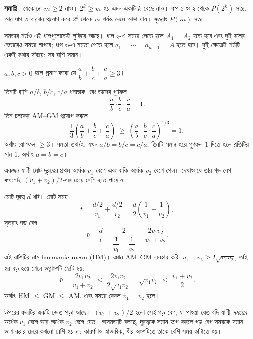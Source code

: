 \documentclass[11pt]{article}
\begin{document}
\textbf{সমাপ্তি।} যেকোনো $m \geq 2$ নাও। $2^k \geq m$ হয় এমন একটি $k$ বেছে নাও।
ধাপ ১ ও ২ থেকে $P(2^k)$ সত্য, আর ধাপ ৩ বারবার প্রয়োগ করে $2^k$ থেকে $m$ পর্যন্ত
নেমে আসা যায়। সুতরাং $P(m)$ সত্য।

সমতার শর্তও এই ধাপগুলোতেই লুকিয়ে আছে। ধাপ ২-এ সমতা পেতে হলে $A_1 = A_2$ হতে হবে
এবং দুই দলের ভেতরেও সমতা লাগবে; ধাপ ৩-এ সমতা পেতে হলে $a_1 = \cdots = a_{n-1}
= A$ হতে হবে। দুই ক্ষেত্রেই শর্তটি একই কথায় দাঁড়ায়: সব রাশি সমান।

\begin{example}
$a, b, c > 0$ হলে প্রমাণ করো যে
$\dfrac{a}{b} + \dfrac{b}{c} + \dfrac{c}{a} \geq 3$।
\end{example}

\begin{solbox}
তিনটি রাশি $a/b$, $b/c$, $c/a$ ধনাত্মক এবং তাদের গুণফল
\[
  \frac{a}{b} \cdot \frac{b}{c} \cdot \frac{c}{a} = 1 .
\]
তিন চলকের AM--GM প্রয়োগ করলে
\[
  \frac{1}{3}\left( \frac{a}{b} + \frac{b}{c} + \frac{c}{a} \right)
  \;\geq\; \left( \frac{a}{b} \cdot \frac{b}{c} \cdot \frac{c}{a} \right)^{1/3} = 1 ,
\]
অর্থাৎ যোগফল $\geq 3$। সমতা তখনই, যখন $a/b = b/c = c/a$; তিনটি সমান হয়ে গুণফল
$1$ দিতে হলে প্রতিটির মান $1$, অর্থাৎ $a = b = c$।
\end{solbox}

\begin{example}
একজন যাত্রী মোট দূরত্বের প্রথম অর্ধেক $v_1$ বেগে এবং বাকি অর্ধেক $v_2$ বেগে গেল।
দেখাও যে তার গড় বেগ কখনোই $(v_1+v_2)/2$-এর চেয়ে বেশি হতে পারে না।
\end{example}

\begin{solbox}
মোট দূরত্ব $d$ ধরি। মোট সময়
\[
  t = \frac{d/2}{v_1} + \frac{d/2}{v_2} = \frac{d}{2}\left( \frac{1}{v_1} + \frac{1}{v_2} \right),
\]
সুতরাং গড় বেগ
\[
  \bar{v} = \frac{d}{t} = \frac{2}{\dfrac{1}{v_1} + \dfrac{1}{v_2}}
          = \frac{2 v_1 v_2}{v_1 + v_2} .
\]
এই রাশিটির নাম harmonic mean (HM)। এখন AM--GM ব্যবহার করি: $v_1 + v_2 \geq
2\sqrt{v_1 v_2}$, তাই হর বড় হয়ে গেলে ভগ্নাংশটি ছোট হয়:
\[
  \bar{v} = \frac{2 v_1 v_2}{v_1+v_2}
  \;\leq\; \frac{2 v_1 v_2}{2\sqrt{v_1 v_2}} = \sqrt{v_1 v_2}
  \;\leq\; \frac{v_1+v_2}{2} .
\]
অর্থাৎ HM $\leq$ GM $\leq$ AM, এবং সমতা কেবল $v_1 = v_2$ হলে।
\end{solbox}

\begin{remark}
উপরের ফলটির একটি ভৌত পড়া আছে। $(v_1+v_2)/2$ হলো সেই গড় বেগ, যা পাওয়া যেত যদি
যাত্রী \emph{সময়ের} অর্ধেক $v_1$ বেগে আর অর্ধেক $v_2$ বেগে যেত। অসমতাটি বলছে,
দূরত্বকে সমান ভাগ করলে গড় বেগ সময়কে সমান ভাগ করার চেয়ে কখনো বেশি হয় না;
কারণটাও স্বাভাবিক, ধীর অংশটিতে তাকে বেশি সময় কাটাতে হয়।
\end{remark}
\end{document}

